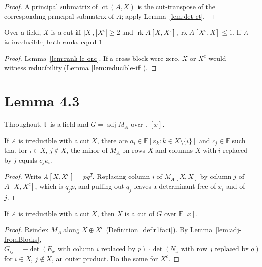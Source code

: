 \begin{proof}
\leanok
{}
A principal submatrix of $\operatorname{ct}(A,X)$ is the cut-transpose of the corresponding
principal submatrix of $A$; apply Lemma~\ref{lem:det-ct}.
\end{proof}

\begin{lemma}
\label{lem:cut-rank}
\leanok
{}
Over a field, $X$ is a cut iff $|X|,|X^c|\ge2$ and
$\operatorname{rk}A[X,X^c],\operatorname{rk}A[X^c,X]\le1$. If $A$ is irreducible, both ranks
equal $1$.
\end{lemma}

\begin{proof}
\leanok
{}
Lemma~\ref{lem:rank-le-one}. If a cross block were zero, $X$ or $X^c$ would witness
reducibility (Lemma~\ref{lem:reducible-iff}).
\end{proof}

\chapter{Lemma 4.3}

Throughout, $\mathbb F$ is a field and $G=\operatorname{adj}M_A$ over $\mathbb F[x]$.

\begin{lemma}
\label{lem:43-minors}
\leanok
{}
If $A$ is irreducible with a cut $X$, there are $a_i\in\mathbb F[x_k:k\in X\setminus\{i\}]$
and $c_j\in\mathbb F$ such that for $i\in X$, $j\notin X$, the minor of $M_A$ on rows $X$ and
columns $X$ with $i$ replaced by $j$ equals $c_ja_i$.
\end{lemma}

\begin{proof}
Write $A[X,X^c]=pq^T$. Replacing column $i$ of $M_A[X,X]$ by column $j$ of $A[X,X^c]$, which
is $q_jp$, and pulling out $q_j$ leaves a determinant free of $x_i$ and of $j$.
\end{proof}

\begin{lemma}
\label{lem:43}
\leanok
{}
If $A$ is irreducible with a cut $X$, then $X$ is a cut of $G$ over $\mathbb F[x]$.
\end{lemma}

\begin{proof}
Reindex $M_A$ along $X\oplus X^c$ (Definition~\ref{def:r1fact}). By
Lemma~\ref{lem:adj-fromBlocks}, $G_{ij}=-\det(E_x\text{ with column }i\text{ replaced by }p)
\cdot\det(N_x\text{ with row }j\text{ replaced by }q)$ for $i\in X$, $j\notin X$, an outer
product. Do the same for $X^c$.
\end{proof}
